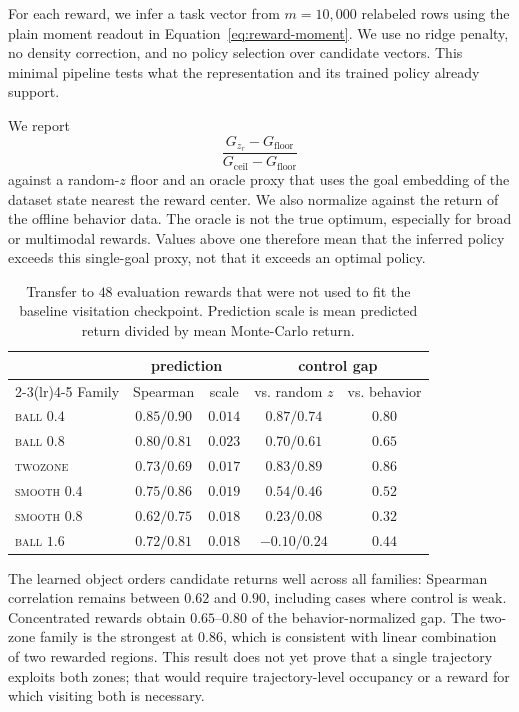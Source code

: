 \documentclass{article}
\begin{document}
For each reward, we infer a task vector from $m=10{,}000$ relabeled rows using the
plain moment readout in Equation~\ref{eq:reward-moment}. We use no ridge penalty,
no density correction, and no policy selection over candidate vectors. This
minimal pipeline tests what the representation and its trained policy already
support.

We report
\begin{equation}
\label{eq:gap}
\frac{G_{z_r}-G_{\mathrm{floor}}}
{G_{\mathrm{ceil}}-G_{\mathrm{floor}}}
\end{equation}
against a random-$z$ floor and an oracle proxy that uses the goal embedding of the
dataset state nearest the reward center. We also normalize against the return of
the offline behavior data. The oracle is not the true optimum, especially for
broad or multimodal rewards. Values above one therefore mean that the inferred
policy exceeds this single-goal proxy, not that it exceeds an optimal policy.

\begin{table}[t]
\centering\small
\begin{tabular}{l c c c c}
\toprule
& \multicolumn{2}{c}{prediction} & \multicolumn{2}{c}{control gap} \\
\cmidrule(lr){2-3}\cmidrule(lr){4-5}
Family & Spearman & scale & vs. random $z$ & vs. behavior \\
\midrule
\textsc{ball} $0.4$   & $0.85/0.90$ & $0.014$ & $0.87/0.74$ & $0.80$ \\
\textsc{ball} $0.8$   & $0.80/0.81$ & $0.023$ & $0.70/0.61$ & $0.65$ \\
\textsc{twozone}      & $0.73/0.69$ & $0.017$ & $\mathbf{0.83/0.89}$ & $\mathbf{0.86}$ \\
\textsc{smooth} $0.4$ & $0.75/0.86$ & $0.019$ & $0.54/0.46$ & $0.52$ \\
\textsc{smooth} $0.8$ & $0.62/0.75$ & $0.018$ & $0.23/0.08$ & $0.32$ \\
\textsc{ball} $1.6$   & $0.72/0.81$ & $0.018$ & $-0.10/0.24$ & $0.44$ \\
\bottomrule
\end{tabular}
\caption{Transfer to $48$ evaluation rewards that were not used to fit the
baseline visitation checkpoint. Prediction scale is mean predicted return divided
by mean Monte-Carlo return.}
\label{tab:l2}
\end{table}

The learned object orders candidate returns well across all families: Spearman
correlation remains between $0.62$ and $0.90$, including cases where control is
weak. Concentrated rewards obtain $0.65$--$0.80$ of the behavior-normalized gap.
The two-zone family is the strongest at $0.86$, which is consistent with linear
combination of two rewarded regions. This result does not yet prove that a single
trajectory exploits both zones; that would require trajectory-level occupancy or
a reward for which visiting both is necessary.
\end{document}
